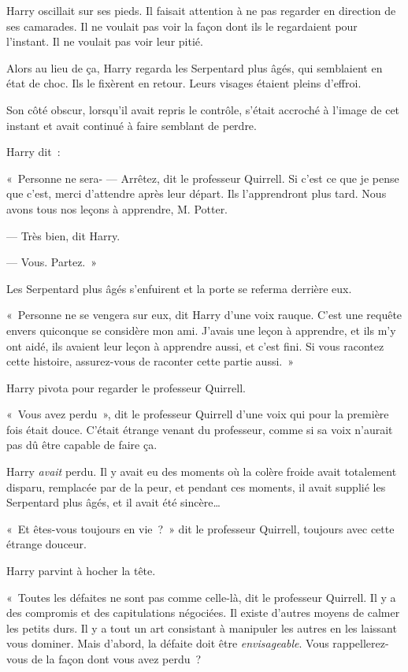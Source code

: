 Harry oscillait sur ses pieds.
Il faisait attention à ne pas regarder en direction de ses camarades.
Il ne voulait pas voir la façon dont ils le regardaient pour l'instant.
Il ne voulait pas voir leur pitié.

Alors au lieu de ça, Harry regarda les Serpentard plus âgés, qui semblaient en état de choc.
Ils le fixèrent en retour.
Leurs visages étaient pleins d'effroi.

Son côté obscur, lorsqu'il avait repris le contrôle, s'était accroché à l'image de cet instant et avait continué à faire semblant de perdre.

Harry dit~:

«~Personne ne sera-
--- Arrêtez, dit le professeur Quirrell.
Si c'est ce que je pense que c'est, merci d'attendre après leur départ.
Ils l'apprendront plus tard.
Nous avons tous nos leçons à apprendre, M. Potter.

--- Très bien, dit Harry.

--- Vous.
Partez.~»

Les Serpentard plus âgés s'enfuirent et la porte se referma derrière eux.

«~Personne ne se vengera sur eux, dit Harry d'une voix rauque.
C'est une requête envers quiconque se considère mon ami.
J'avais une leçon à apprendre, et ils m'y ont aidé, ils avaient leur leçon à apprendre aussi, et c'est fini.
Si vous racontez cette histoire, assurez-vous de raconter cette partie aussi.~»

Harry pivota pour regarder le professeur Quirrell.

«~Vous avez perdu~», dit le professeur Quirrell d'une voix qui pour la première fois était douce.
C'était étrange venant du professeur, comme si sa voix n'aurait pas dû être capable de faire ça.

Harry \emph{avait} perdu.
Il y avait eu des moments où la colère froide avait totalement disparu, remplacée par de la peur, et pendant ces moments, il avait supplié les Serpentard plus âgés, et il avait été sincère…

«~Et êtes-vous toujours en vie~?~»
dit le professeur Quirrell, toujours avec cette étrange douceur.

Harry parvint à hocher la tête.

«~Toutes les défaites ne sont pas comme celle-là, dit le professeur Quirrell.
Il y a des compromis et des capitulations négociées.
Il existe d'autres moyens de calmer les petits durs.
Il y a tout un art consistant à manipuler les autres en les laissant vous dominer.
Mais d'abord, la défaite doit être \emph{envisageable}.
Vous rappellerez-vous de la façon dont vous avez perdu~?


